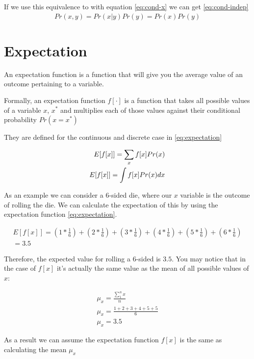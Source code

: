 \documentclass{article}
\begin{document}
If we use this equivalence to with equation \ref{eq:cond-x} we can get \ref{eq:cond-indep}
\begin{align} \label{eq:cond-indep}
	Pr\left( x,y \right) = Pr\left( x|y \right) Pr\left( y \right) = Pr\left( x \right) Pr\left( y \right) 
\end{align}

\section{Expectation}

An expectation function is a function that will give you the average value of an outcome pertaining to a variable. 

Formally, an expectation function $f[\cdot]$ is a function that takes all possible values of a variable $x$, $x^*$ and multiplies each of those values against their conditional probability $Pr\left( x=x^* \right) $

They are defined for the continuous and discrete case in \ref{eq:expectation}

\begin{align}\label{eq:expectation}	
	E[f[x]]=\sum_{x} f[x]Pr(x) \\
	\notag E[f[x]]=\int f[x]Pr(x)dx
\end{align}

As an example we can consider a 6-sided die, where our $x$ variable is the outcome of rolling the die. We can calculate the expectation of this by using the expectation function \ref{eq:expectation}.

\begin{align*}
	E[f[x]]=\left( 1*\frac{1}{6} \right) + \left( 2*\frac{1}{6} \right) + \left( 3*\frac{1}{6} \right) + \left( 4*\frac{1}{6} \right) + \left( 5*\frac{1}{6} \right) + \left( 6*\frac{1}{6} \right) \\
	= 3.5
\end{align*}

Therefore, the expected value for rolling a 6-sided is $3.5$. You may notice that in the case of $f[x]$ it's actually the same value as the mean of all possible values of $x$:

\begin{align*}
	\mu_x = \frac{\sum_{1}^{n}x}{n} \\
	\mu_x = \frac{1 + 2 + 3 + 4 + 5 + 5}{6} \\
	\mu_x = 3.5
\end{align*}

As a result we can assume the expectation function $f[x]$ is the same as calculating the mean $\mu_x$
\end{document}
